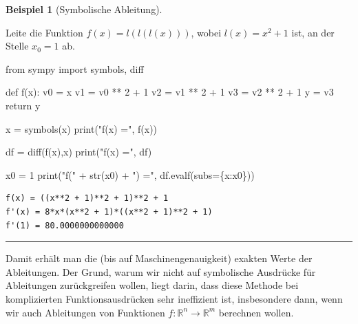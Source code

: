 \documentclass[
  letterpaper,
  DIV=11,
  oneside]{scrreprt}
\newenvironment{Shaded}{\begin{snugshade}}{\end{snugshade}}
\newcommand{\BuiltInTok}[1]{\textcolor[rgb]{0.00,0.23,0.31}{#1}}
\newcommand{\ControlFlowTok}[1]{\textcolor[rgb]{0.00,0.23,0.31}{#1}}
\newcommand{\DecValTok}[1]{\textcolor[rgb]{0.68,0.00,0.00}{#1}}
\newcommand{\ImportTok}[1]{\textcolor[rgb]{0.00,0.46,0.62}{#1}}
\newcommand{\KeywordTok}[1]{\textcolor[rgb]{0.00,0.23,0.31}{#1}}
\newcommand{\NormalTok}[1]{\textcolor[rgb]{0.00,0.23,0.31}{#1}}
\newcommand{\OperatorTok}[1]{\textcolor[rgb]{0.37,0.37,0.37}{#1}}
\newcommand{\StringTok}[1]{\textcolor[rgb]{0.13,0.47,0.30}{#1}}
\theoremstyle{definition}
\theoremstyle{definition}
\newtheorem{example}{Beispiel}[chapter]
\theoremstyle{remark}
\begin{document}
\leavevmode{}%
\begin{example}[Symbolische Ableitung]\label{exm-symbDiff}

Leite die Funktion \(f(x) = l(l(l(x)))\), wobei \(l(x) = x^2 + 1\) ist,
an der Stelle \(x_0 = 1\) ab.

\begin{Shaded}
\begin{Highlighting}[]
\ImportTok{from}\NormalTok{ sympy  }\ImportTok{import}\NormalTok{ symbols, diff}

\KeywordTok{def}\NormalTok{ f(x):}
\NormalTok{    v0 }\OperatorTok{=}\NormalTok{ x}
\NormalTok{    v1 }\OperatorTok{=}\NormalTok{ v0 }\OperatorTok{**} \DecValTok{2} \OperatorTok{+} \DecValTok{1}
\NormalTok{    v2 }\OperatorTok{=}\NormalTok{ v1 }\OperatorTok{**} \DecValTok{2} \OperatorTok{+} \DecValTok{1}
\NormalTok{    v3 }\OperatorTok{=}\NormalTok{ v2 }\OperatorTok{**} \DecValTok{2} \OperatorTok{+} \DecValTok{1}
\NormalTok{    y }\OperatorTok{=}\NormalTok{ v3}
    \ControlFlowTok{return}\NormalTok{ y}

\NormalTok{x }\OperatorTok{=}\NormalTok{ symbols(}\StringTok{\textquotesingle{}x\textquotesingle{}}\NormalTok{)}
\BuiltInTok{print}\NormalTok{(}\StringTok{"f(x) ="}\NormalTok{, f(x))}

\NormalTok{df }\OperatorTok{=}\NormalTok{ diff(f(x),x)}
\BuiltInTok{print}\NormalTok{(}\StringTok{"f\textquotesingle{}(x) ="}\NormalTok{, df)}

\NormalTok{x0 }\OperatorTok{=} \DecValTok{1}
\BuiltInTok{print}\NormalTok{(}\StringTok{"f\textquotesingle{}("} \OperatorTok{+} \BuiltInTok{str}\NormalTok{(x0) }\OperatorTok{+} \StringTok{") ="}\NormalTok{, df.evalf(subs}\OperatorTok{=}\NormalTok{\{x:x0\}))}
\end{Highlighting}
\end{Shaded}

\begin{verbatim}
f(x) = ((x**2 + 1)**2 + 1)**2 + 1
f'(x) = 8*x*(x**2 + 1)*((x**2 + 1)**2 + 1)
f'(1) = 80.0000000000000
\end{verbatim}

\end{example}

\begin{center}\rule{0.5\linewidth}{0.5pt}\end{center}

Damit erhält man die (bis auf Maschinengenauigkeit) exakten Werte der
Ableitungen. Der Grund, warum wir nicht auf symbolische Ausdrücke für
Ableitungen zurückgreifen wollen, liegt darin, dass diese Methode bei
komplizierten Funktionsausdrücken sehr ineffizient ist, insbesondere
dann, wenn wir auch Ableitungen von Funktionen
\(f : \mathbb{R}^n \rightarrow \mathbb{R}^m\) berechnen wollen.
\end{document}

